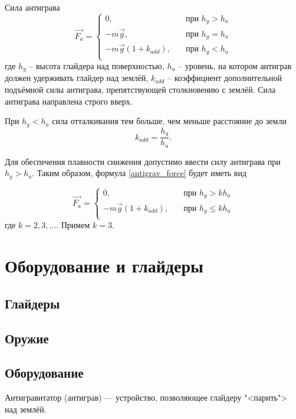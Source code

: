 \documentclass[a4paper,12pt]{report}
\begin{document}
Сила антиграва
\begin{equation}
\label{antigrav_force}
\vec{F_a} =
\begin{cases}
0, & \quad \text{при } h_{g} > h_a \\
-m\vec{g}, & \quad \text{при } h_{g} = h_a \\
-m\vec{g}(1+ k_{add}), & \quad \text{при } h_{g} < h_a \\
\end{cases}
\end{equation}
где $h_{g}$ -- высота глайдера над поверхностью, $h_a$ -- уровень, на котором антиграв должен удерживать глайдер над землёй, $k_{add}$ -- коэффициент дополнительной подъёмной силы антиграва, препятствующей столкновению с землёй.
Сила антиграва направлена строго вверх.

При $h_g < h_a$ сила отталкивания тем больше, чем меньше расстояние до земли
\begin{equation}
k_{add} =\frac{h_{g}}{h_{a}}.
\end{equation}

Для обеспечения плавности снижения допустимо ввести силу антиграва при $h_{g} > h_a$. Таким образом, формула \eqref{antigrav_force} будет иметь вид

\begin{equation}
\vec{F_a} =
\begin{cases}
0, & \quad \text{при } h_{g} > k h_a \\
-m\vec{g}(1+ k_{add}), & \quad \text{при } h_{g} \le k h_a \\
\end{cases}
\end{equation}
где $k=2,3,\dots$. Примем $k=3$.

\chapter{Оборудование и глайдеры}
\section{Глайдеры}
\section{Оружие}
\section{Оборудование}

Антигравитатор (антиграв) --- устройство, позволяющее глайдеру "<парить"> над землёй.
\end{document}
